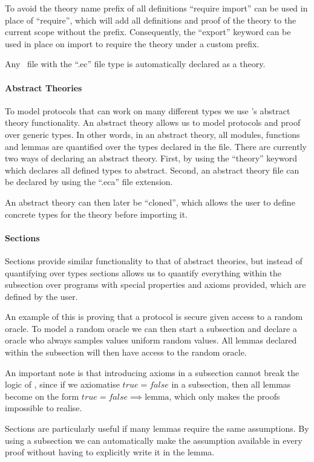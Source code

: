 To avoid the theory name prefix of all definitions ``require import'' can be
used in place of ``require'', which will add all definitions and proof of the
theory to the current scope without the prefix. Consequently, the ``export''
keyword can be used in place on import to require the theory under a custom prefix.

Any \easycrypt\ file with the ``.ec'' file type is automatically declared as a
theory.

\paragraph{Abstract Theories}
To model protocols that can work on many different
types we use \easycrypt's abstract theory functionality. An abstract theory allows us to model
protocols and proof over generic types. In other words, in an abstract theory,
all modules, functions and lemmas are quantified over the types declared in the file.
There are currently two ways of declaring an abstract theory. First, by using the
``theory'' keyword which declares all defined types to abstract.
Second, an abstract theory file can be declared by using the ``.eca'' file extension.

An abstract theory can then later be ``cloned'', which allows the user to define
concrete types for the theory before importing it.

\paragraph{Sections}
Sections provide similar functionality to that of abstract theories, but instead of quantifying over
types sections allows us to quantify everything within the subsection over programs
with special properties and axioms provided, which are defined by the user.

An example of this is proving that a protocol is secure given access to a
random oracle.
To model a random oracle we can then start a subsection and declare a oracle who
always samples values uniform random values.
All lemmas declared within the subsection will then have access to the random
oracle.

An important note is that introducing axioms in a subsection cannot break the logic
of \easycrypt, since if we axiomatise $true = false$ in a subsection, then all
lemmas become on the form $true = false \implies \text{lemma}$, which only
makes the proofs impossible to realise.

Sections are particularly useful if many lemmas require the same assumptions. By
using a subsection we can automatically make the assumption available in every
proof without having to explicitly write it in the lemma.

